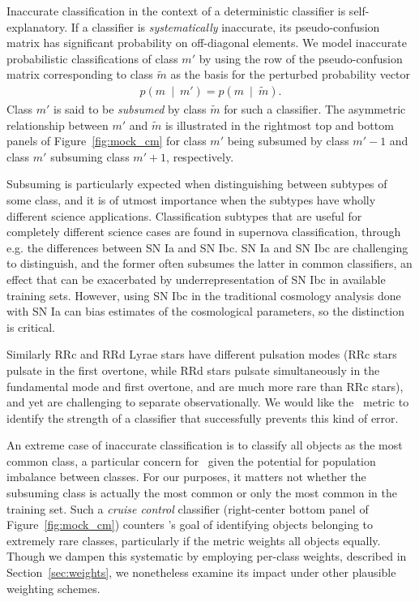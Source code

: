 Inaccurate classification in the context of a deterministic classifier is self-explanatory.
If a classifier is \textit{systematically} inaccurate, its pseudo-confusion matrix has significant probability on off-diagonal elements.
We model inaccurate probabilistic classifications of class $m'$ by using the row of the pseudo-confusion matrix corresponding to class $\tilde{m}$ as the basis for the perturbed probability vector
\begin{eqnarray}
  \label{eq:subsume}
  p(m\ \mid\ m') = p(m\ \mid\ \tilde{m}).
\end{eqnarray}
Class $m'$ is said to be \textit{subsumed} by class $\tilde{m}$ for such a classifier.
The asymmetric relationship between $m'$ and $\tilde{m}$ is illustrated in the rightmost top and bottom panels of Figure~\ref{fig:mock_cm} for class $m'$ being subsumed by class $m'-1$ and class $m'$ subsuming class $m'+1$, respectively.

Subsuming is particularly expected when distinguishing between subtypes of some class, and it is of utmost importance when the subtypes have wholly different science applications.
Classification subtypes that are useful for completely different science cases are found in supernova classification, through e.g. the differences between SN Ia and SN Ibc. SN Ia and SN Ibc are challenging to distinguish, and the former often subsumes the latter in common classifiers, an effect that can be exacerbated by underrepresentation of SN Ibc in available training sets.
However, using SN Ibc in the traditional cosmology analysis done with SN Ia can bias estimates of the cosmological parameters, so the distinction is critical.

Similarly RRc and RRd Lyrae stars have different pulsation modes (RRc stars pulsate in the first overtone, while RRd stars pulsate simultaneously in the fundamental mode and first overtone, and are much more rare than RRc stars), and yet are challenging to separate observationally. We would like the \plasticc\ metric to identify the strength of a classifier that successfully prevents this kind of error.

An extreme case of inaccurate classification is to classify all objects as the most common class, a particular concern for \plasticc\ given the potential for population imbalance between classes.
For our purposes, it matters not whether the subsuming class is actually the most common or only the most common in the training set.
Such a \textit{cruise control} classifier (right-center bottom panel of Figure~\ref{fig:mock_cm}) counters \plasticc's goal of identifying objects belonging to extremely rare classes, particularly if the metric weights all objects equally.
Though we dampen this systematic by employing per-class weights, described in Section~\ref{sec:weights}, we nonetheless examine its impact under other plausible weighting schemes.

